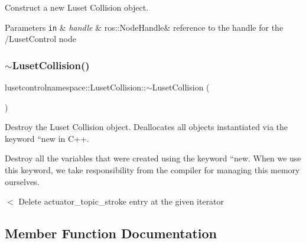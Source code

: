 Construct a new Luset Collision object. 


\begin{DoxyParams}[1]{Parameters}
\mbox{\tt in}  & {\em handle} & ros\+::\+Node\+Handle\& reference to the handle for the /\+Luset\+Control node \\
\hline
\end{DoxyParams}
\mbox{\label{classlusetcontrolnamespace_1_1LusetCollision_a4639f920509325c05cc1d27e6008366a}} 
\subsubsection{\texorpdfstring{$\sim$\+Luset\+Collision()}{~LusetCollision()}}
{\footnotesize\ttfamily lusetcontrolnamespace\+::\+Luset\+Collision\+::$\sim$\+Luset\+Collision (\begin{DoxyParamCaption}{ }\end{DoxyParamCaption})}



Destroy the Luset Collision object. Deallocates all objects instantiated via the keyword ``new\textquotesingle{}\textquotesingle{} in C++. 

Destroy all the variables that were created using the keyword ``new\textquotesingle{}\textquotesingle{}. When we use this keyword, we take responsibility from the compiler for managing this memory ourselves.

$<$ Delete actuator\+\_\+topic\+\_\+stroke entry at the given iterator 

\subsection{Member Function Documentation}
\mbox{\label{classlusetcontrolnamespace_1_1LusetCollision_a035907cd6d2820811a87c1f7945df287}} 
